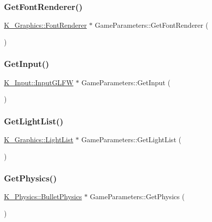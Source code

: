 \subsubsection{\texorpdfstring{Get\+Font\+Renderer()}{GetFontRenderer()}}
{\footnotesize\ttfamily \mbox{\hyperlink{class_k___graphics_1_1_font_renderer}{K\+\_\+\+Graphics\+::\+Font\+Renderer}} $\ast$ Game\+Parameters\+::\+Get\+Font\+Renderer (\begin{DoxyParamCaption}{ }\end{DoxyParamCaption})}

\mbox{\label{class_game_parameters_a7f547214ffbdf1a6fffe8f3153fe3d26}} 
\subsubsection{\texorpdfstring{Get\+Input()}{GetInput()}}
{\footnotesize\ttfamily \mbox{\hyperlink{class_k___input_1_1_input_g_l_f_w}{K\+\_\+\+Input\+::\+Input\+G\+L\+FW}} $\ast$ Game\+Parameters\+::\+Get\+Input (\begin{DoxyParamCaption}{ }\end{DoxyParamCaption})}

\mbox{\label{class_game_parameters_a311ce21eaa2b395f9aefd494499efba2}} 
\subsubsection{\texorpdfstring{Get\+Light\+List()}{GetLightList()}}
{\footnotesize\ttfamily \mbox{\hyperlink{class_k___graphics_1_1_light_list}{K\+\_\+\+Graphics\+::\+Light\+List}} $\ast$ Game\+Parameters\+::\+Get\+Light\+List (\begin{DoxyParamCaption}{ }\end{DoxyParamCaption})}

\mbox{\label{class_game_parameters_a6fbc7ef320a7b72f3b7d7833070f5d3c}} 
\subsubsection{\texorpdfstring{Get\+Physics()}{GetPhysics()}}
{\footnotesize\ttfamily \mbox{\hyperlink{class_k___physics_1_1_bullet_physics}{K\+\_\+\+Physics\+::\+Bullet\+Physics}} $\ast$ Game\+Parameters\+::\+Get\+Physics (\begin{DoxyParamCaption}{ }\end{DoxyParamCaption})}

